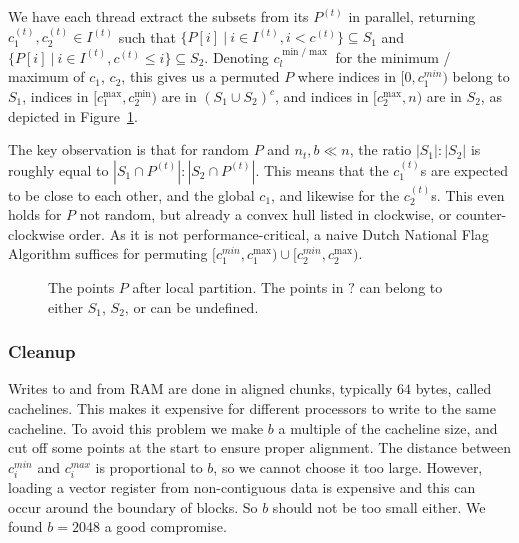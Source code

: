 We have each thread extract the subsets from its $P^{(t)}$ in parallel, 
returning $c_{1}^{(t)}, c_{2}^{(t)} \in I^{(t)}$ such that
$\{P[i] \ | \ i \in I^{(t)}, i < c^{(t)}\} \subseteq S_1$
and $\{P[i] \ | \ i \in I^{(t)}, c^{(t)} \leq i\} \subseteq S_2$.
Denoting $c_{l}^{\min / \max}$ for the minimum / maximum of $c_1$, $c_2$, this
gives us a permuted $P$ where indices in $[0, c_1^{min})$ belong to $S_1$,
indices in $[c_{1}^{\max}, c_2^{\min})$ are in $(S_1 \cup S_2)^c$, and
indices in $[c_2^{\max}, n)$ are in $S_2$, as depicted in 
Figure~\ref{fig:local_part}.

The key observation is that for random $P$ and $n_t, b \ll n$, the ratio 
$|S_1| : |S_2|$ is roughly equal to $|S_1 \cap P^{(t)}| : |S_2 \cap P^{(t)}|$.
This means that the $c_1^{(t)}$s are expected to be close to each other, and
the global $c_1$, and likewise for the $c_2^{(t)}$s. This even holds for $P$
not random, but already a convex hull listed in clockwise, or counter-clockwise
order. As it is not performance-critical, a naive Dutch National Flag Algorithm 
suffices for permuting $[c_1^{min}, c_1^{\max}) \cup [c_2^{min}, c_2^{\max})$.

\begin{figure}[ht]
    \caption{The points $P$ after local partition. The points in $?$ can
             belong to either $S_1$, $S_2$, or can be undefined.}
    \label{fig:local_part}
\end{figure}

\subsubsection{Cleanup}


Writes to and from RAM are done in aligned chunks, typically $64$ bytes, called
cachelines. This makes it expensive for different processors to write to the 
same cacheline. To avoid this problem we make $b$ a multiple of
the cacheline size, and cut off some points at the start to ensure proper
alignment. The distance between $c_i^{min}$ and $c_i^{max}$ is proportional
to $b$, so we cannot choose it too large. However, loading a vector register 
from non-contiguous data is expensive and this can occur around the boundary
of blocks. So $b$ should not be too small either. We found $b = 2048$ a good
compromise.

